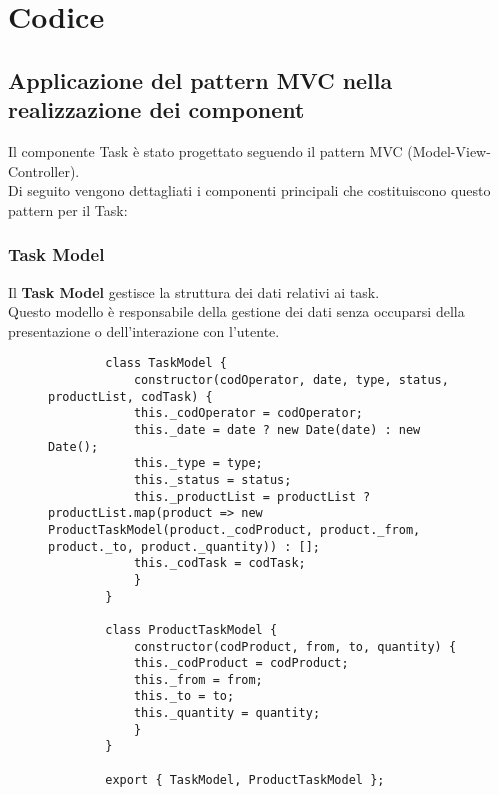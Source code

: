 \section{Codice}
\subsection{Applicazione del pattern MVC nella realizzazione dei component}
Il componente Task è stato progettato seguendo il pattern MVC (Model-View-Controller).
\\Di seguito vengono dettagliati i componenti principali che costituiscono questo pattern per il Task:
\subsubsection{Task Model}
Il \textbf{Task Model} gestisce la struttura dei dati relativi ai task.\\ Questo modello è responsabile della gestione dei dati senza occuparsi della presentazione o dell’interazione con l’utente.
\begin{figure}[H]
    \centering
    \begin{verbatim}
        class TaskModel {
            constructor(codOperator, date, type, status, productList, codTask) {
            this._codOperator = codOperator;
            this._date = date ? new Date(date) : new Date();
            this._type = type;
            this._status = status;
            this._productList = productList ? productList.map(product => new ProductTaskModel(product._codProduct, product._from, product._to, product._quantity)) : [];
            this._codTask = codTask;
            }
        }
        
        class ProductTaskModel {
            constructor(codProduct, from, to, quantity) {
            this._codProduct = codProduct;
            this._from = from;
            this._to = to;
            this._quantity = quantity;
            }
        }
        
        export { TaskModel, ProductTaskModel };
\end{verbatim}
\end{figure}


